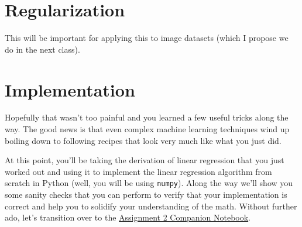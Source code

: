 \documentclass[assignment02_Solutions]{subfiles}
\begin{document}
\section{Regularization}

This will be important for applying this to image datasets (which I propose we do in the next class).


\section{Implementation}

Hopefully that wasn't too painful and you learned a few useful tricks along the way.  The good news is that even complex machine learning techniques wind up boiling down to following recipes that look very much like what you just did.

At this point, you'll be taking the derivation of linear regression that you just worked out and using it to implement the linear regression algorithm from scratch in Python (well, you will be using {\tt numpy}).  Along the way we'll show you some sanity checks that you can perform to verify that your implementation is correct and help you to solidify your understanding of the math. Without further ado, let's transition over to the \href{https://colab.research.google.com/github/mlfa19/assignments/blob/master/Module\%201/02/Assignment_02_Companion.ipynb}{Assignment 2 Companion Notebook}.

\end{document}
